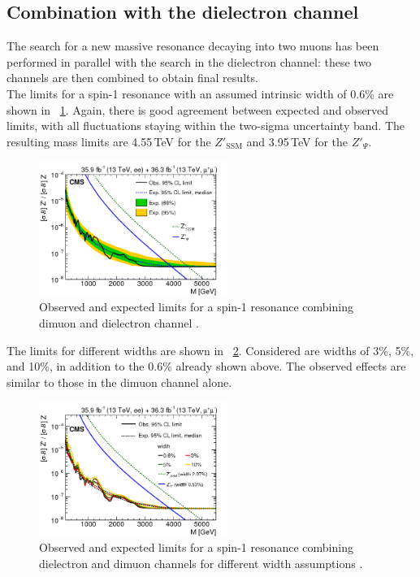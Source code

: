\subsection{Combination with the dielectron channel}
The search for a new massive resonance decaying into two muons has been performed in parallel with the search in the dielectron channel: these two channels are then combined to obtain final results. \\
The limits for a spin-1 resonance with an assumed intrinsic width of 0.6\% are shown in \figurename~\ref{fig:limitComb}. Again, there is good agreement between expected and observed limits, with all fluctuations staying within the two-sigma uncertainty band. The resulting mass limits are 4.55\,TeV for the $Z'_{\mathrm{SSM}}$ and 3.95\,TeV for the $Z'_{\Psi}$.

\begin{figure}[htbp]
\centering
\includegraphics[width=0.55\textwidth]{Images/Cap5/Limit_mmee}
\caption{Observed and expected limits for a spin-1 resonance combining dimuon and dielectron channel \cite{PAS}.}
\label{fig:limitComb}
\end{figure}
The limits for different widths are shown in \figurename~\ref{fig:limitWidthsComb}. Considered are widths of 3\%, 5\%, and 10\%, in addition to the 0.6\% already shown above. The observed effects are similar to those in the dimuon channel alone.

\begin{figure}[htbp]
\centering
\includegraphics[width=0.55\textwidth]{Images/Cap5/Limit_mmee_widths}
\caption{Observed and expected limits for a spin-1 resonance combining dielectron and dimuon channels for different width assumptions \cite{PAS}.}
\label{fig:limitWidthsComb}
\end{figure}
 

